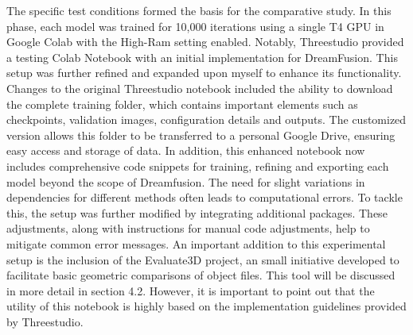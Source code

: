 The specific test conditions formed the basis for the comparative study. In this phase, each model was trained for 10,000 iterations using a single T4 GPU in Google Colab with the High-Ram setting enabled. Notably, Threestudio provided a testing Colab Notebook with an initial implementation for DreamFusion. This setup was further refined and expanded upon myself to enhance its functionality. Changes to the original Threestudio notebook included the ability to download the complete training folder, which contains important elements such as checkpoints, validation images, configuration details and outputs. The customized version allows this folder to be transferred to a personal Google Drive, ensuring easy access and storage of data. In addition, this enhanced notebook now includes comprehensive code snippets for training, refining and exporting each model beyond the scope of Dreamfusion. The need for slight variations in dependencies for different methods often leads to computational errors. To tackle this, the setup was further modified by integrating additional packages. These adjustments, along with instructions for manual code adjustments, help to mitigate common error messages. An important addition to this experimental setup is the inclusion of the Evaluate3D project, an small initiative developed to facilitate basic geometric comparisons of object files. This tool will be discussed in more detail in section 4.2. However, it is important to point out that the utility of this notebook is highly based on the implementation guidelines provided by Threestudio.

